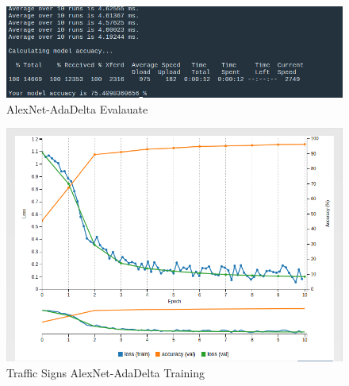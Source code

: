 \documentclass[10pt,journal,compsoc]{IEEEtran}
\begin{document}
\begin{figure}[thpb]
      \centering
      \includegraphics[width=\linewidth]{alex-10-adadelta-exp99-evaluate.jpg}
      \caption{AlexNet-AdaDelta Evalauate}
      \label{fig:alexnetevaluate}

\end{figure}

\begin{figure}[thpb]
      \centering
      \includegraphics[width=\linewidth]{TrafficSigns-AlexNet-10-AdaDelta-Exp99-Training.jpg}
      \caption{Traffic Signs AlexNet-AdaDelta Training}
      \label{fig:traffictraining}

\end{figure}
\end{document}
